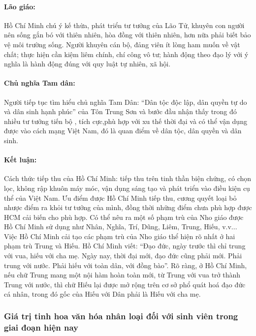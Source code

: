 \paragraph{Lão giáo:}
Hồ Chí Minh chú ý kế thừa, phát triển tư tưởng của Lão Tử, khuyên con người nên sống gắn bó với thiên nhiên, hòa đồng với thiên nhiên, hơn nữa phải biết bảo vệ môi trường sống. Người khuyên cán bộ, đảng viên ít lòng ham muốn về vật chất; thực hiện cần kiệm liêm chính, chí công vô tư; hành động theo đạo lý với ý nghĩa là hành động đúng với quy luật tự nhiên, xã hội.

\paragraph{Chủ nghĩa Tam dân:}
Người tiếp tục tìm hiểu chủ nghĩa Tam Dân: ``Dân tộc độc lập, dân quyền tự do và dân sinh hạnh phúc'' của Tôn Trung Sơn và bước đầu nhận thấy trong đó nhiều tư tưởng tiến bộ , tích cực,phù hợp với xu thế thời đại và có thể vận dụng được vào cách mạng Việt Nam, đó là quan điểm về dân tộc, dân quyền và dân sinh.

\paragraph{Kết luận:}
Cách thức tiếp thu của Hồ Chí Minh: tiếp thu trên tinh thần biện chứng, có chọn lọc, không rập khuôn máy móc, vận dụng sáng tạo và phát triển vào điều kiện cụ thể của Việt Nam. Ưu điểm được Hồ Chí Minh tiếp thu, cương quyết loại bỏ nhược điểm ra khỏi tư tưởng của mình, đồng thời những điểm chưa phù hợp được HCM cải biến cho phù hợp. Có thể nêu ra một số phạm trù của Nho giáo được Hồ Chí Minh sử dụng như Nhân, Nghĩa, Trí, Dũng, Liêm, Trung, Hiếu, v.v... Việc Hồ Chí Minh cải tạo các phạm trù của Nho giáo thể hiện rõ nhất ở hai phạm trù Trung và Hiếu. Hồ Chí Minh viết: ``Đạo đức, ngày trước thì chỉ trung với vua, hiếu với cha mẹ. Ngày nay, thời đại mới, đạo đức cũng phải mới. Phải trung với nước. Phải hiếu với toàn dân, với đồng bào''. Rõ ràng, ở Hồ Chí Minh, nếu chữ Trung mang một nội hàm hoàn toàn mới, từ Trung với vua trở thành Trung với nước, thì chữ Hiếu lại được mở rộng trên cơ sở phổ quát hoá đạo đức cá nhân, trong đó gốc của Hiếu với Dân phải là Hiếu với cha mẹ.

\subsubsection{Giá trị tinh hoa văn hóa nhân loại đối với sinh viên trong giai đoạn hiện nay}

